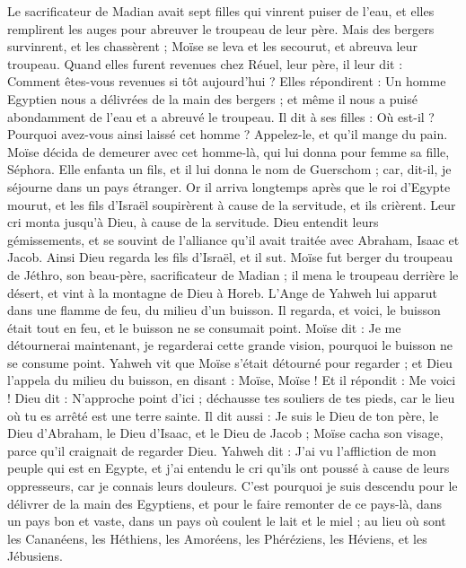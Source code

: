 \begin{multicols}{2}
Le sacrificateur de Madian avait sept filles qui vinrent puiser de l'eau, et elles remplirent les auges pour abreuver le troupeau de leur père.
Mais des bergers survinrent, et les chassèrent ; Moïse se leva et les secourut, et abreuva leur troupeau.
Quand elles furent revenues chez Réuel, leur père, il leur dit : Comment êtes-vous revenues si tôt aujourd'hui ?
Elles répondirent : Un homme Egyptien nous a délivrées de la main des bergers ; et même il nous a puisé abondamment de l'eau et a abreuvé le troupeau.
Il dit à ses filles : Où est-il ? Pourquoi avez-vous ainsi laissé cet homme ? Appelez-le, et qu'il mange du pain.
Moïse décida de demeurer avec cet homme-là, qui lui donna pour femme sa fille, Séphora.
Elle enfanta un fils, et il lui donna le nom de Guerschom ; car, dit-il, je séjourne dans un pays étranger.
Or il arriva longtemps après que le roi d'Egypte mourut, et les fils d'Israël soupirèrent à cause de la servitude, et ils crièrent. Leur cri monta jusqu'à Dieu, à cause de la servitude.
Dieu entendit leurs gémissements, et se souvint de l'alliance qu'il avait traitée avec Abraham, Isaac et Jacob.
Ainsi Dieu regarda les fils d'Israël, et il sut.
\VerseOne{}Moïse fut berger du troupeau de Jéthro, son beau-père, sacrificateur de Madian ; il mena le troupeau derrière le désert, et vint à la montagne de Dieu à Horeb.
L'Ange de Yahweh lui apparut dans une flamme de feu, du milieu d'un buisson. Il regarda, et voici, le buisson était tout en feu, et le buisson ne se consumait point.
Moïse dit : Je me détournerai maintenant, je regarderai cette grande vision, pourquoi le buisson ne se consume point.
Yahweh vit que Moïse s'était détourné pour regarder ; et Dieu l'appela du milieu du buisson, en disant : Moïse, Moïse ! Et il répondit : Me voici !
Dieu dit : N'approche point d'ici ; déchausse tes souliers de tes pieds, car le lieu où tu es arrêté est une terre sainte.
Il dit aussi : Je suis le Dieu de ton père, le Dieu d'Abraham, le Dieu d'Isaac, et le Dieu de Jacob ; Moïse cacha son visage, parce qu'il craignait de regarder Dieu.
Yahweh dit : J'ai vu l'affliction de mon peuple qui est en Egypte, et j'ai entendu le cri qu'ils ont poussé à cause de leurs oppresseurs, car je connais leurs douleurs.
C'est pourquoi je suis descendu pour le délivrer de la main des Egyptiens, et pour le faire remonter de ce pays-là, dans un pays bon et vaste, dans un pays où coulent le lait et le miel ; au lieu où sont les Cananéens, les Héthiens, les Amoréens, les Phéréziens, les Héviens, et les Jébusiens.

\end{multicols}
